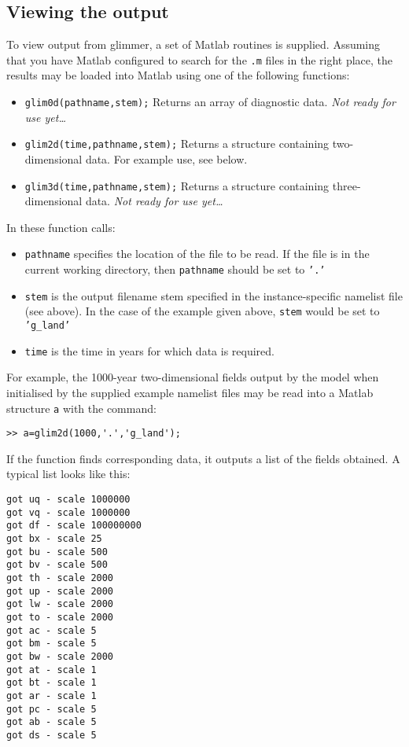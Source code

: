 \subsection{Viewing the output}
%
To view output from glimmer, a set of Matlab routines is supplied. Assuming
that you have Matlab configured to search for the \texttt{.m} files in the
right place, the results may be loaded into Matlab using one of the following
functions:
%
\begin{itemize}
\item \texttt{glim0d(pathname,stem);} Returns an array of diagnostic
  data. \emph{Not ready for use yet\ldots}
\item \texttt{glim2d(time,pathname,stem);} Returns a structure containing
  two-dimensional data. For example use, see below.
\item \texttt{glim3d(time,pathname,stem);} Returns a structure containing
  three-dimensional data. \emph{Not ready for use yet\ldots}
\end{itemize}
%
In these function calls:
\begin{itemize}
\item \texttt{pathname} specifies the location of the file
to be read. If the file is in the current working directory, then
\texttt{pathname} should be set to \texttt{'.'}
\item \texttt{stem} is the output filename stem specified in the
  instance-specific namelist file (see above). In the case of the example
  given above, \texttt{stem} would be set to \texttt{'g\_land'}
\item \texttt{time} is the time in years for which data is required.
\end{itemize}
%
For example, the 1000-year two-dimensional fields output by the model when initialised
by the supplied example namelist files may be read into a Matlab structure
\texttt{a} with the command:
%
\begin{verbatim}
>> a=glim2d(1000,'.','g_land');
\end{verbatim}
%
If the function finds corresponding data, it outputs a list of the fields
obtained. A typical list looks like this:
%
\begin{verbatim}
got uq - scale 1000000
got vq - scale 1000000
got df - scale 100000000
got bx - scale 25
got bu - scale 500
got bv - scale 500
got th - scale 2000
got up - scale 2000
got lw - scale 2000
got to - scale 2000
got ac - scale 5
got bm - scale 5
got bw - scale 2000
got at - scale 1
got bt - scale 1
got ar - scale 1
got pc - scale 5
got ab - scale 5
got ds - scale 5
\end{verbatim}
